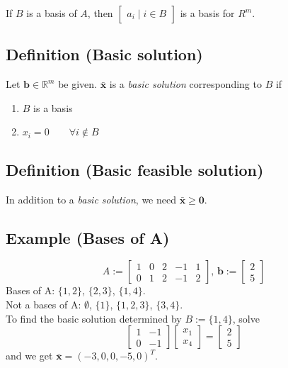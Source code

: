 If $B$ is a basis of $A$, then 
$\begin{bmatrix}
    a_i \mid i\in B
\end{bmatrix}$
is a basis for $R^m$.

\subsection{Definition (Basic solution)}
Let $\mathbf{b}\in\mathbb{R}^m$ be given. $\mathbf{\bar{x}}$ is a \emph{basic solution} 
corresponding to $B$ if
\begin{enumerate}
    \item $B$ is a basis
    \item $x_i=0 \qquad \forall i\notin B$
\end{enumerate}

\subsection{Definition (Basic feasible solution)}
In addition to a \emph{basic solution}, we need  $\mathbf{\bar{x}}\ge \mathbf{0}$.

\subsection{Example (Bases of A)}
\[A:=
\begin{bmatrix}
    1 & 0 & 2 & -1 & 1\\
    0 & 1 & 2 & -1 & 2
\end{bmatrix}
\text{, }
\mathbf{b}:=
\begin{bmatrix}
    2\\
    5
\end{bmatrix}
\]
Bases of A: $\{1,2\}$, $\{2,3\}$, $\{1,4\}$.\\
Not a bases of A: $\emptyset$, $\{1\}$, $\{1,2,3\}$, $\{3,4\}$.\\
To find the basic solution determined by $B:=\{1,4\}$, solve
\[
\begin{bmatrix}
    1 & -1\\
    0 & -1
\end{bmatrix}
\begin{bmatrix}
    x_1\\
    x_4
\end{bmatrix}
=
\begin{bmatrix}
    2\\
    5
\end{bmatrix}
\]
and we get $\mathbf{\bar{x}}=(-3,0,0,-5,0)^T$.

